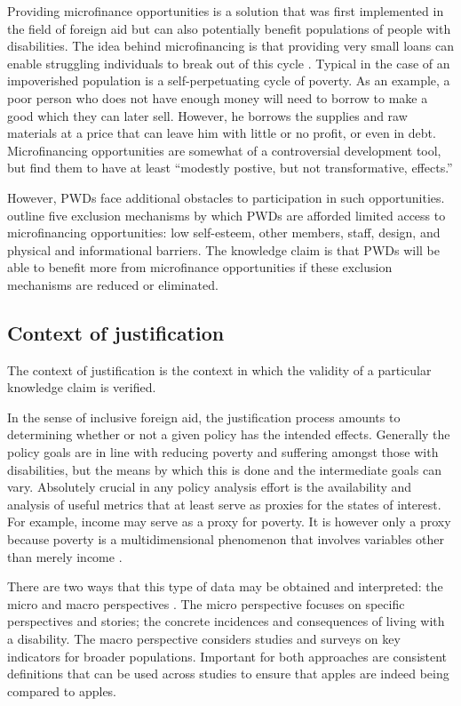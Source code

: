 \documentclass[a4paper]{article}
\begin{document}
Providing microfinance opportunities is a solution that was first implemented
in the field of foreign aid but can also potentially benefit populations of
people with disabilities. The idea behind microfinancing is that providing
very small loans can enable struggling individuals to break out of this
cycle \citep{wendt2006building}. Typical in the case of an impoverished
population is a self-perpetuating cycle of poverty. As an example, a poor
person who does not have enough money will need to borrow to make a good which
they can later sell. However, he borrows the supplies and raw materials at a
price that can leave him with little or no profit, or even in debt.
Microfinancing opportunities are somewhat of a controversial development tool,
but \cite{banerjee2015six} find them to have at least ``modestly postive, but
not transformative, effects.''

However, PWDs face additional obstacles to participation in such
opportunities. \cite{mersland2008access} outline five exclusion mechanisms by
which PWDs are afforded limited access to microfinancing opportunities: low
self-esteem, other members, staff, design, and physical and informational
barriers. The knowledge claim is that PWDs will be able to benefit more from
microfinance opportunities if these exclusion mechanisms are reduced or
eliminated.

\subsection{Context of justification}

The context of justification is the context in which the validity of a
particular knowledge claim is verified.

In the sense of inclusive foreign aid, the justification process amounts to
determining whether or not a given policy has the intended effects. Generally
the policy goals are in line with reducing poverty and suffering amongst those
with disabilities, but the means by which this is done and the intermediate
goals can vary. Absolutely crucial in any policy analysis effort is the
availability and analysis of useful metrics that at least serve as proxies for
the states of interest. For example, income may serve as a proxy for poverty.
It is however only a proxy because poverty is a multidimensional phenomenon
that involves variables other than merely income
\citep{alkire2011understandings}.

There are two ways that this type of data may be obtained and interpreted: the
micro and macro perspectives \citep{ingstad2011disability}.
The micro perspective focuses on specific perspectives and stories; the
concrete incidences and consequences of living with a disability. The macro
perspective considers studies and surveys on key indicators for broader
populations. Important for both approaches are consistent definitions that can
be used across studies to ensure that apples are indeed being compared to
apples.
\end{document}
